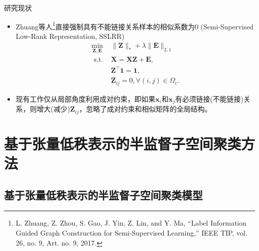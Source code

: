 \documentclass{beamer}
\begin{document}
\begin{frame}{研究现状}

    \begin{itemize}
        
        \item Zhuang等人\footnote{\cite{7931596} L. Zhuang, Z. Zhou, S. Gao, J. Yin, Z. Lin, and Y. Ma, “Label Information Guided Graph Construction for Semi-Supervised Learning,” IEEE TIP, vol. 26, no. 9, Art. no. 9, 2017.}直接强制具有不能链接关系样本的相似系数为0 (Semi-Supervised Low-Rank Representation, SSLRR)
        \begin{equation}
        \begin{array}{ll}
        \min _{\mathbf{Z}, \mathbf{E}} & \|\mathbf{Z}\|_{*}+\lambda\|\mathbf{E}\|_{2,1} \\
        \text { s.t. } & \mathbf{X}=\mathbf{X} \mathbf{Z}+\mathbf{E}, \\
        & \mathbf{Z}^{\top} \mathbf{1}=\mathbf{1}, \\
        & \mathbf{Z}_{i j}=0, \forall(i, j) \in \Omega_c.
        \end{array}
        \end{equation}
    	
        \item 现有工作仅从局部角度利用成对约束，即如果$\mathbf{x}_i$和$\mathbf{x}_j$有必须链接(不能链接)关系，则增大(减少)$\mathbf{Z}_{ij}$，忽略了成对约束和相似矩阵的全局结构。
 
    \end{itemize}

\end{frame}


\section{基于张量低秩表示的半监督子空间聚类方法}

\subsection{基于张量低秩表示的半监督子空间聚类模型}
\end{document}
